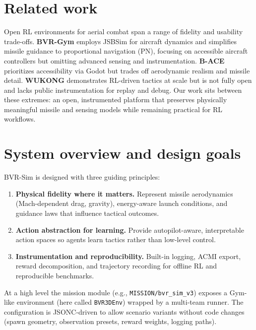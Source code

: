 \documentclass[11pt]{article}
\begin{document}
\section{Related work}
Open RL environments for aerial combat span a range of fidelity and usability trade-offs. \textbf{BVR-Gym} employs JSBSim for aircraft dynamics and simplifies missile guidance to proportional navigation (PN), focusing on accessible aircraft controllers but omitting advanced sensing and instrumentation. \textbf{B-ACE} prioritizes accessibility via Godot but trades off aerodynamic realism and missile detail. \textbf{WUKONG} demonstrates RL-driven tactics at scale but is not fully open and lacks public instrumentation for replay and debug. Our work sits between these extremes: an open, instrumented platform that preserves physically meaningful missile and sensing models while remaining practical for RL workflows.

\section{System overview and design goals}
BVR-Sim is designed with three guiding principles:
\begin{enumerate}[noitemsep]
    \item \textbf{Physical fidelity where it matters.} Represent missile aerodynamics (Mach-dependent drag, gravity), energy-aware launch conditions, and guidance laws that influence tactical outcomes.
    \item \textbf{Action abstraction for learning.} Provide autopilot-aware, interpretable action spaces so agents learn tactics rather than low-level control.
    \item \textbf{Instrumentation and reproducibility.} Built-in logging, ACMI export, reward decomposition, and trajectory recording for offline RL and reproducible benchmarks.
\end{enumerate}

At a high level the mission module (e.g., \texttt{MISSION/bvr\_sim\_v3}) exposes a Gym-like environment (here called \texttt{BVR3DEnv}) wrapped by a multi-team runner. The configuration is JSONC-driven to allow scenario variants without code changes (spawn geometry, observation presets, reward weights, logging paths).

\end{document}
